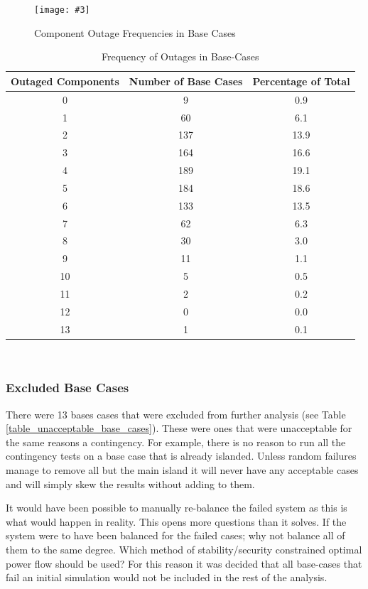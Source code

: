 \documentclass[a4paper,oneside,12pt]{report}
\newcommand{\image}[3] {
  \begin{figure}
    \begin{center}
      \texttt{[image: \#3]}
      \caption{#2}
      \label{#1}
    \end{center}
  \end{figure}
}
\begin{document}
\image{outagefrequencies1000}{Component Outage Frequencies in Base Cases}{outagefrequencies1000.png}

\begin{table}[htbp]
\caption{Frequency of Outages in Base-Cases}
\label{table_outage_frequency}
\centering
\begin{tabular}{c||c||c}
\bfseries Outaged Components & \bfseries Number of Base Cases & \bfseries Percentage of Total  \\ 
\hline \hline
0 & 9 & 0.9  \\ 
1 & 60 & 6.1  \\ 
2 & 137 & 13.9  \\ 
3 & 164 & 16.6  \\ 
4 & 189 & 19.1  \\ 
5 & 184 & 18.6  \\ 
6 & 133 & 13.5  \\ 
7 & 62 & 6.3  \\ 
8 & 30 & 3.0  \\ 
9 & 11 & 1.1  \\ 
10 & 5 & 0.5  \\ 
11 & 2 & 0.2  \\ 
12 & 0 & 0.0  \\ 
13 & 1 & 0.1  \\ 
\hline
\end{tabular}\\
\end{table}


\subsubsection{Excluded Base Cases}

There were 13 bases cases that were excluded from further analysis (see Table \ref{table_unacceptable_base_cases}). These were ones that were unacceptable for the same reasons a contingency. For example, there is no reason to run all the contingency tests on a base case that is already islanded. Unless random failures manage to remove all but the main island it will never have any acceptable cases and will simply skew the results without adding to them.

It would have been possible to manually re-balance the failed system as this is what would happen in reality. This opens more questions than it solves. If the system were to have been balanced for the failed cases; why not balance all of them to the same degree. Which method of stability/security constrained optimal power flow should be used? For this reason it was decided that all base-cases that fail an initial simulation would not be included in the rest of the analysis.
\end{document}
